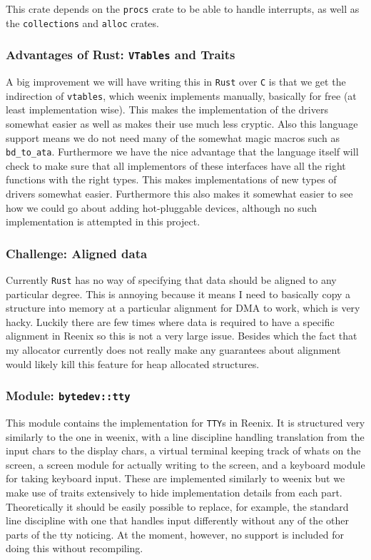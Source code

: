 \documentclass[12pt,letterpaper]{article}
\newcommand{\rust}{\texttt{Rust}}
\begin{document}
This crate depends on the \texttt{procs} crate to be able to handle interrupts,
as well as the \texttt{collections} and \texttt{alloc} crates.

\subsubsection{Advantages of Rust: \texttt{VTables} and Traits}
A big improvement we will have writing this in \rust{} over \texttt{C} is that
we get the indirection of \texttt{vtables}, which weenix implements manually,
basically for free (at least implementation wise). This makes the
implementation of the drivers somewhat easier as well as makes their use much
less cryptic. Also this language support means we do not need many of the
somewhat magic macros such as \texttt{bd\_to\_ata}. Furthermore we have the
nice advantage that the language itself will check to make sure that all
implementors of these interfaces have all the right functions with the right
types. This makes implementations of new types of drivers somewhat easier.
Furthermore this also makes it somewhat easier to see how we could go about
adding hot-pluggable devices, although no such implementation is attempted in
this project.

\subsubsection{Challenge: Aligned data}
Currently \rust{} has no way of specifying that data should be aligned to any
particular degree. This is annoying because it means I need to basically copy a
structure into memory at a particular alignment for DMA to work, which is very
hacky.  Luckily there are few times where data is required to have a specific
alignment in Reenix so this is not a very large issue. Besides which the fact
that my allocator currently does not really make any guarantees about alignment
would likely kill this feature for heap allocated structures.

\subsubsection{Module: \texttt{bytedev::tty}}
This module contains the implementation for \texttt{TTY}s in Reenix. It is
structured very similarly to the one in weenix, with a line discipline handling
translation from the input chars to the display chars, a virtual terminal
keeping track of whats on the screen, a screen module for actually writing to
the screen, and a keyboard module for taking keyboard input. These are
implemented similarly to weenix but we make use of traits extensively to hide
implementation details from each part. Theoretically it should be easily
possible to replace, for example, the standard line discipline with one that
handles input differently without any of the other parts of the tty noticing.
At the moment, however, no support is included for doing this without
recompiling.
\end{document}
